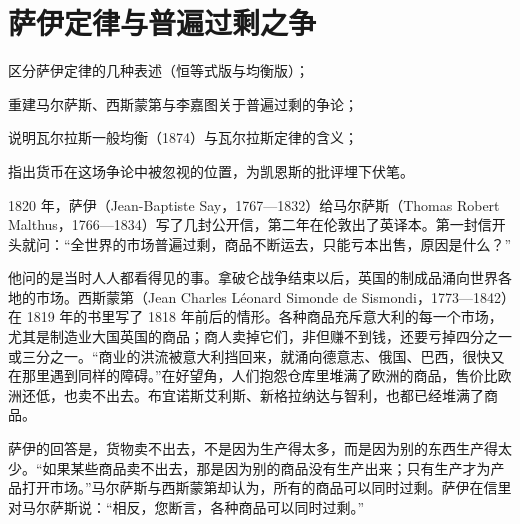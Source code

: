 \chapter{萨伊定律与普遍过剩之争}\label{ch:say}

\begin{chapterguide}
\begin{guidegoals}
\item 区分萨伊定律的几种表述（恒等式版与均衡版）；
\item 重建马尔萨斯、西斯蒙第与李嘉图关于普遍过剩的争论；
\item 说明瓦尔拉斯一般均衡（1874）与瓦尔拉斯定律的含义；
\item 指出货币在这场争论中被忽视的位置，为凯恩斯的批评埋下伏笔。
\end{guidegoals}
\end{chapterguide}

1820 年，萨伊（Jean-Baptiste Say，1767—1832）给马尔萨斯（Thomas Robert Malthus，1766—1834）写了几封公开信，第二年在伦敦出了英译本。第一封信开头就问：“全世界的市场普遍过剩，商品不断运去，只能亏本出售，原因是什么？”\cite{saylet1821}

他问的是当时人人都看得见的事。拿破仑战争结束以后，英国的制成品涌向世界各地的市场。西斯蒙第（Jean Charles Léonard Simonde de Sismondi，1773—1842）在 1819 年的书里写了 1818 年前后的情形。各种商品充斥意大利的每一个市场，尤其是制造业大国英国的商品；商人卖掉它们，非但赚不到钱，还要亏掉四分之一或三分之一\cite{sismondi1819}。“商业的洪流被意大利挡回来，就涌向德意志、俄国、巴西，很快又在那里遇到同样的障碍。”\cite{sismondi1819}在好望角，人们抱怨仓库里堆满了欧洲的商品，售价比欧洲还低，也卖不出去。布宜诺斯艾利斯、新格拉纳达与智利，也都已经堆满了商品\cite{sismondi1819}。

萨伊的回答是，货物卖不出去，不是因为生产得太多，而是因为别的东西生产得太少。“如果某些商品卖不出去，那是因为别的商品没有生产出来；只有生产才为产品打开市场。”\cite{saylet1821}马尔萨斯与西斯蒙第却认为，所有的商品可以同时过剩。萨伊在信里对马尔萨斯说：“相反，您断言，各种商品可以同时过剩。”\cite{saylet1821}

